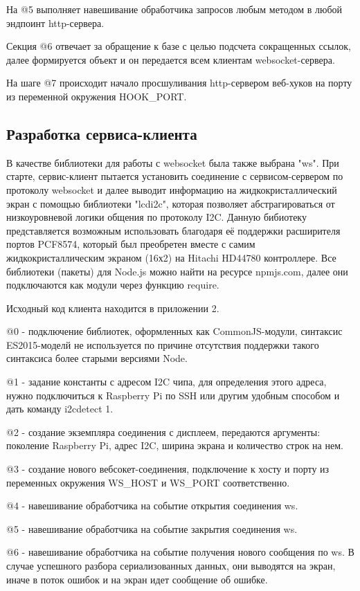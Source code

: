 \documentclass[a4paper, 12pt]{article}
\begin{document}
    На @5 выполняет навешивание обработчика запросов любым методом в любой эндпоинт http-сервера.

    Секция @6 отвечает за обращение к базе с целью подсчета сокращенных ссылок, далее формируется объект и
    он передается всем клиентам websocket-сервера.

    На шаге @7 происходит начало просшуливания http-сервером веб-хуков на порту из переменной окружения HOOK\_PORT.

    \subsection*{Разработка сервиса-клиента}
    В качестве библиотеки для работы с websocket была также выбрана "ws". При старте, сервис-клиент пытается установить
    соединение с сервисом-сервером по протоколу websocket и далее выводит информацию на жидкокристаллический экран с помощью библиотеки
    "lcdi2c", которая позволяет абстрагироваться от низкоуровневой логики общения по протоколу I2C.
    Данную бибиотеку представляется возможным использовать благодаря её поддержки расширителя портов PCF8574, который был
    преобретен вместе с самим жидкокристаллическим экраном (16х2) на Hitachi HD44780 контроллере.
    Все библиотеки (пакеты) для Node.js можно найти на ресурсе npmjs.com, далее они подключаются как модули через функцию require.

    Исходный код клиента находится в приложении 2.

    @0 - подключение библиотек, оформленных как CommonJS-модули, синтаксис ES2015-моделй не используется по причине
    отсутствия поддержки такого синтаксиса более старыми версиями Node.

    @1 - задание константы с адресом I2C чипа, для определения этого адреса, нужно подключиться к Raspberry Pi по SSH или
    другим удобным способом и дать команду i2cdetect 1.

    @2 - создание экземпляра соединения с дисплеем, передаются аргументы: поколение Raspberry Pi, адрес I2C, ширина экрана
    и количество строк на нем.

    @3 - создание нового вебсокет-соединения, подключение к хосту и порту из переменных окружения
    WS\_HOST и WS\_PORT соответственно.

    @4 - навешивание обработчика на событие открытия соединения ws.

    @5 - навешивание обработчика на событие закрытия соединения ws.

    @6 - навешивание обработчика на событие получения нового сообщения по ws. В случае успешного
    разбора сериализованных данных, они выводятся на экран, иначе в поток ошибок и на экран идет сообщение об ошибке.
\end{document}
